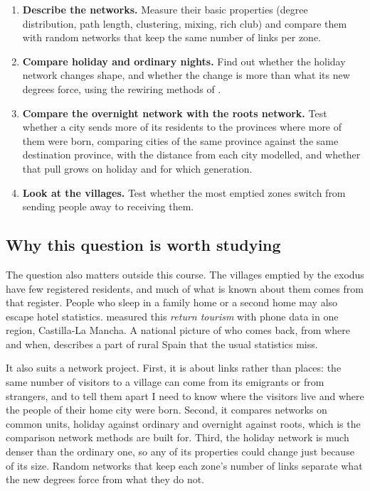 \begin{enumerate}[label=\textbf{T\arabic*.}]
\item \textbf{Describe the networks.} Measure their basic properties (degree distribution, path length, clustering, mixing, rich club) and compare them with random networks that keep the same number of links per zone.
\item \textbf{Compare holiday and ordinary nights.} Find out whether the holiday network changes shape, and whether the change is more than what its new degrees force, using the rewiring methods of \citet{zhou2007structural}.
\item \textbf{Compare the overnight network with the roots network.} Test whether a city sends more of its residents to the provinces where more of them were born, comparing cities of the same province against the same destination province, with the distance from each city modelled, and whether that pull grows on holiday and for which generation.
\item \textbf{Look at the villages.} Test whether the most emptied zones switch from sending people away to receiving them.
\end{enumerate}

\subsection{Why this question is worth studying}

The question also matters outside this course. The villages emptied by the exodus have few registered residents, and much of what is known about them comes from that register. People who sleep in a family home or a second home may also escape hotel statistics. \citet{garciagonzalez2024retorno} measured this \emph{return tourism} with phone data in one region, Castilla-La Mancha. A national picture of who comes back, from where and when, describes a part of rural Spain that the usual statistics miss.

It also suits a network project. First, it is about links rather than places: the same number of visitors to a village can come from its emigrants or from strangers, and to tell them apart I need to know where the visitors live and where the people of their home city were born. Second, it compares networks on common units, holiday against ordinary and overnight against roots, which is the comparison network methods are built for. Third, the holiday network is much denser than the ordinary one, so any of its properties could change just because of its size. Random networks that keep each zone's number of links separate what the new degrees force from what they do not.

